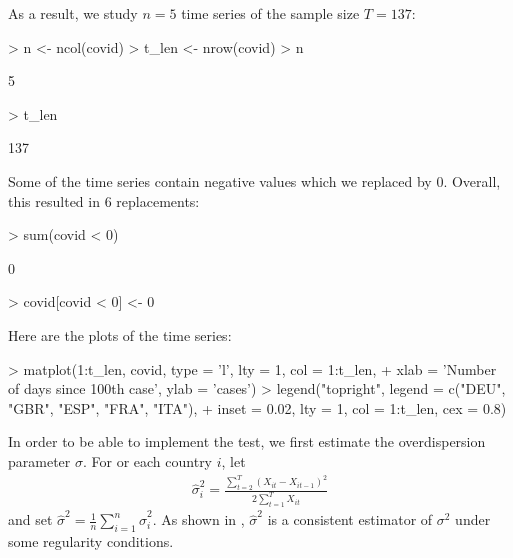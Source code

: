 \documentclass[a4paper]{article}
\begin{document}
As a result, we study $n = 5$ time series of the sample size $T = 137$:

\begin{Schunk}
\begin{Sinput}
> n     <- ncol(covid)
> t_len <- nrow(covid)
> n
\end{Sinput}
\begin{Soutput}
[1] 5
\end{Soutput}
\begin{Sinput}
> t_len
\end{Sinput}
\begin{Soutput}
[1] 137
\end{Soutput}
\end{Schunk}

Some of the time series contain negative values which we replaced by $0$. Overall, this resulted in $6$ replacements:

\begin{Schunk}
\begin{Sinput}
> sum(covid < 0)
\end{Sinput}
\begin{Soutput}
[1] 0
\end{Soutput}
\begin{Sinput}
> covid[covid < 0] <- 0
\end{Sinput}
\end{Schunk}

Here are the plots of the time series:

\begin{Schunk}
\begin{Sinput}
> matplot(1:t_len, covid, type = 'l', lty = 1, col = 1:t_len,
+         xlab = 'Number of days since 100th case', ylab = 'cases')
> legend("topright", legend = c("DEU", "GBR", "ESP", "FRA", "ITA"),
+        inset = 0.02, lty = 1, col = 1:t_len, cex = 0.8)
\end{Sinput}
\end{Schunk}

In order to be able to implement the test, we first estimate the overdispersion parameter $\sigma$. For or each country $i$, let
\begin{align*}
\hat{\sigma}_i^2 = \frac{\sum_{t=2}^T (X_{it}-X_{it-1})^2}{2 \sum_{t=1}^T X_{it}}
\end{align*}
and set $\hat{\sigma}^2 = \frac{1}{n} \sum_{i=1}^n \hat{\sigma}_i^2$. As shown in \cite{KhismatullinaVogt2023}, $\hat{\sigma}^2$ is a consistent estimator of $\sigma^2$ under some regularity conditions.
\end{document}
